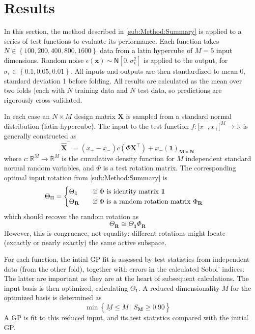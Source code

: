 \documentclass[preprint,12pt]{elsarticle}
\newcommand*{\M}[1]{\ensuremath{#1}\xspace}
\newcommand*{\vr}[1]{\M{\mathbf{#1}}}
\newcommand*{\st}[1]{\M{\mathbb{#1}}}
\newcommand{\T}[1]{\text{#1}}
\newcommand*{\QT}[2][]{\M{\quad\T{#2}\ifthenelse{\equal{#1}{}}{\quad}{#1}}}
\newcommand*{\gauss}[2]{\mathsf{N}\!\left\lbrack{} #1 , #2 \right\rbrack}
\newcommand*{\set}[1]{\M{\left\lbrace#1\right\rbrace}}
\newcommand*{\setbuilder}[2]{\M{\left\lbrace#1 \: \big\vert \: #2\right\rbrace}}
\begin{document}
    \section{Results} \label{sec:Results}
        In this section, the method described in \cref{sub:Method:Summary} is applied to a series of test functions to evaluate its performance. Each function takes $N \in \set{100, 200, 400, 800, 1600}$ data from a latin hypercube of $M=5$ input dimensions. Random noise $\epsilon(\vr{x}) \sim \gauss{0}{\sigma_{\epsilon}^{2}}$ is applied to the output, for $\sigma_{\epsilon} \in \set{0.1, 0.05, 0.01}$. All inputs and outputs are then standardized to mean 0, standard deviation 1 before folding.
        All results are calculated as the mean over two folds (each with $N$ training data and $N$ test data, so predictions are rigorously cross-validated. 

        In each case an \M{N \times M} design matrix \vr{X} is sampled from a standard normal distribution (latin hypercube). 
        The input to the test function \M{f\colon \lbrack x_-, x_+ \rbrack^{M} \to \st{R}} is generally constructed as
        \begin{equation} \label{def:Xhat}
            \vr{\hat{X}}^{\intercal} = (x_+ - x_-) c(\Phi \vr{X}^{\intercal}) + x_-(\vr{1})_{\vr{M} \times \vr{N}}
        \end{equation}
        where \M{c\colon \st{R}^M\to\st{R}^M} is the cumulative density function for \M{M} independent standard normal random variables, and \M{\Phi} is a test rotation matrix. 
        The corresponding optimal input rotation from \cref{sub:Method:Summary} is
        \begin{equation}
            \Theta_{\Pi} = \begin{cases}
                \Theta_{\vr{1}} & \QT{if \M{\Phi} is identity matrix \M{\vr{1}}} \\
                \Theta_{\vr{R}} & \QT{if \M{\Phi} is a random rotation matrix \M{\Phi_{\vr{R}}}}
            \end{cases}
        \end{equation}
        which should recover the random rotation as
        \begin{equation}
            \Theta_{\vr{R}} \cong \Theta_{\vr{1}} \Phi_{\vr{R}}
        \end{equation}
        However, this is congruence, not equality: different rotations might locate (excactly or nearly exactly) the same active subspace.

        For each function, the intial GP fit is assessed by test statistics from independent data (from the other fold), together with errors in the calculated Sobol' indices. The latter are important as they are at the heart of subsequent calculations. The input basis is then optimized, calculating $\Theta_{\vr{1}}$.
        A reduced dimensionality \M{\underline{M}} for the optimized basis is determined as 
        \begin{equation} \label{eq:Results:Mbar}
            \min \setbuilder{\underline{M} \leq M}{S_{\underline{\vr{M}}} \geq 0.90}
        \end{equation}
        A GP is fit to this reduced input, and its test statistics compared with the initial GP.
\end{document}
